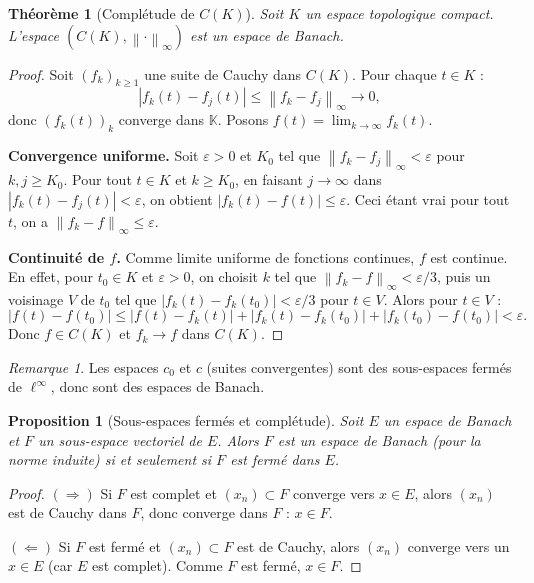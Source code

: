 \documentclass[a4paper,12pt]{book}
\newcommand{\K}{\mathbb{K}}
\newcommand{\norm}[1]{\left\| #1 \right\|}
\newcommand{\abs}[1]{\left| #1 \right|}
\theoremstyle{definition}
\theoremstyle{plain}
\newtheorem{theoreme}[definition]{Théorème}
\newtheorem{proposition}[definition]{Proposition}
\theoremstyle{remark}
\newtheorem{remarque}[definition]{Remarque}
\begin{document}
\begin{theoreme}[Complétude de $C(K)$]\label{thm:CK-complet}
Soit $K$ un espace topologique compact. L'espace $(C(K), \norm{\cdot}_\infty)$ est un espace de Banach.
\end{theoreme}

\begin{proof}
Soit $(f_k)_{k \geq 1}$ une suite de Cauchy dans $C(K)$. Pour chaque $t \in K$ :
\[
    \abs{f_k(t) - f_j(t)} \leq \norm{f_k - f_j}_\infty \to 0,
\]
donc $(f_k(t))_k$ converge dans $\K$. Posons $f(t) = \lim_{k\to\infty} f_k(t)$.

\textbf{Convergence uniforme.} Soit $\varepsilon > 0$ et $K_0$ tel que $\norm{f_k - f_j}_\infty < \varepsilon$ pour $k, j \geq K_0$. Pour tout $t \in K$ et $k \geq K_0$, en faisant $j \to \infty$ dans $\abs{f_k(t) - f_j(t)} < \varepsilon$, on obtient $\abs{f_k(t) - f(t)} \leq \varepsilon$. Ceci étant vrai pour tout $t$, on a $\norm{f_k - f}_\infty \leq \varepsilon$.

\textbf{Continuité de $f$.} Comme limite uniforme de fonctions continues, $f$ est continue. En effet, pour $t_0 \in K$ et $\varepsilon > 0$, on choisit $k$ tel que $\norm{f_k - f}_\infty < \varepsilon/3$, puis un voisinage $V$ de $t_0$ tel que $\abs{f_k(t) - f_k(t_0)} < \varepsilon/3$ pour $t \in V$. Alors pour $t \in V$ :
\[
    \abs{f(t) - f(t_0)} \leq \abs{f(t) - f_k(t)} + \abs{f_k(t) - f_k(t_0)} + \abs{f_k(t_0) - f(t_0)} < \varepsilon.
\]
Donc $f \in C(K)$ et $f_k \to f$ dans $C(K)$.
\end{proof}

\begin{remarque}
Les espaces $c_0$ et $c$ (suites convergentes) sont des sous-espaces fermés de $\ell^\infty$, donc sont des espaces de Banach.
\end{remarque}

\begin{proposition}[Sous-espaces fermés et complétude]\label{prop:sous-espace-ferme-complet}
Soit $E$ un espace de Banach et $F$ un sous-espace vectoriel de $E$. Alors $F$ est un espace de Banach (pour la norme induite) si et seulement si $F$ est fermé dans $E$.
\end{proposition}

\begin{proof}
$(\Rightarrow)$ Si $F$ est complet et $(x_n) \subset F$ converge vers $x \in E$, alors $(x_n)$ est de Cauchy dans $F$, donc converge dans $F$ : $x \in F$.

$(\Leftarrow)$ Si $F$ est fermé et $(x_n) \subset F$ est de Cauchy, alors $(x_n)$ converge vers un $x \in E$ (car $E$ est complet). Comme $F$ est fermé, $x \in F$.
\end{proof}
\end{document}
